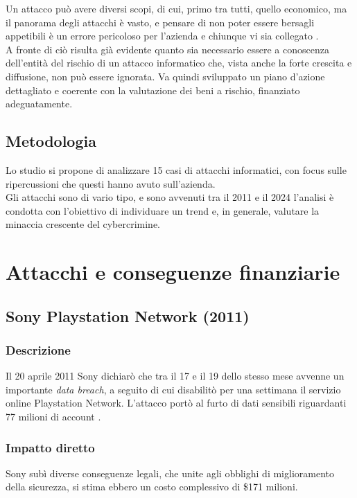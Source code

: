 \documentclass[12pt,a4paper,twoside]{report}
\begin{document}
Un attacco pu\`o avere diversi scopi, di cui, primo tra tutti, quello economico, ma il panorama degli attacchi \`e vasto, e pensare di non poter essere bersagli appetibili \`e un errore pericoloso per l'azienda e chiunque vi sia collegato \cite{enisa_threat_landscape}.\\
A fronte di ci\`o risulta gi\`a evidente quanto sia necessario essere a conoscenza dell'entit\`a del rischio di un attacco informatico che, vista anche la forte crescita e diffusione, non pu\`o essere ignorata. Va quindi sviluppato un piano d'azione dettagliato e coerente con la valutazione dei beni a rischio, finanziato adeguatamente.\\

\section{Metodologia}
Lo studio si propone di analizzare 15 casi di attacchi informatici, con focus sulle ripercussioni che questi hanno avuto sull'azienda.\\
Gli attacchi sono di vario tipo, e sono avvenuti tra il 2011 e il 2024 l'analisi \`e condotta con l'obiettivo di individuare un trend e, in generale, valutare la minaccia crescente del cybercrimine.\\  
\newpage



\chapter{Attacchi e conseguenze finanziarie}\label{chap:attacks}

\section{Sony Playstation Network (2011)}
\subsection{Descrizione}
Il 20 aprile 2011 Sony dichiar\`o che tra il 17 e il 19 dello stesso mese avvenne un importante \textit{data breach}, a seguito di cui disabilit\`o per una settimana il servizio online Playstation Network. L'attacco port\`o al furto di dati sensibili riguardanti 77 milioni di account \cite{Sony_PNT_guardian}\cite{Sony_pnt}.\\
\subsection{Impatto diretto}
Sony sub\`i diverse conseguenze legali, che unite agli obblighi di miglioramento della sicurezza, si stima ebbero un costo complessivo di \$171 milioni.\\
\end{document}
